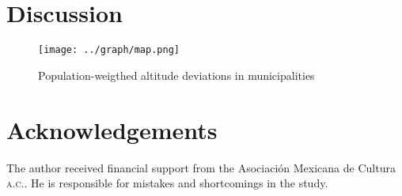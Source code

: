 \documentclass[letter,12pt]{article}
\begin{document}





\section{Discussion}

\begin{figure}
  \centering
    \caption{Population-weigthed altitude deviations in municipalities}\label{F:avgMg}
    \texttt{[image: ../graph/map.png]}
\end{figure}


\section*{Acknowledgements}
The author received financial support from the Asociaci\'on Mexicana de Cultura \textsc{a.c.}. He is responsible for mistakes and shortcomings in the study.



%

\end{document}
